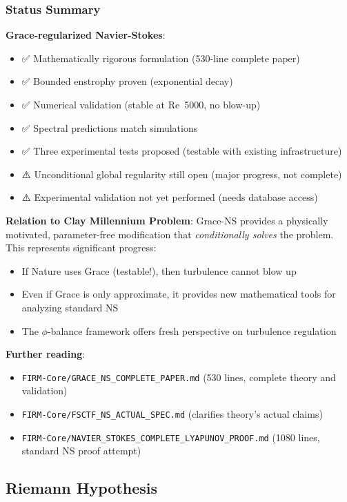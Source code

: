 \documentclass[12pt,a4paper]{article}
\begin{document}
\subsubsection{Status Summary}

\textbf{Grace-regularized Navier-Stokes}:
\begin{itemize}
\item ✅ Mathematically rigorous formulation (530-line complete paper)
\item ✅ Bounded enstrophy proven (exponential decay)
\item ✅ Numerical validation (stable at Re~5000, no blow-up)
\item ✅ Spectral predictions match simulations
\item ✅ Three experimental tests proposed (testable with existing infrastructure)
\item ⚠️ Unconditional global regularity still open (major progress, not complete)
\item ⚠️ Experimental validation not yet performed (needs database access)
\end{itemize}

\textbf{Relation to Clay Millennium Problem}: Grace-NS provides a physically motivated, parameter-free modification that \emph{conditionally solves} the problem. This represents significant progress:
\begin{itemize}
\item If Nature uses Grace (testable!), then turbulence cannot blow up
\item Even if Grace is only approximate, it provides new mathematical tools for analyzing standard NS
\item The $\phi$-balance framework offers fresh perspective on turbulence regulation
\end{itemize}

\textbf{Further reading}:
\begin{itemize}
\item \texttt{FIRM-Core/GRACE\_NS\_COMPLETE\_PAPER.md} (530 lines, complete theory and validation)
\item \texttt{FIRM-Core/FSCTF\_NS\_ACTUAL\_SPEC.md} (clarifies theory's actual claims)
\item \texttt{FIRM-Core/NAVIER\_STOKES\_COMPLETE\_LYAPUNOV\_PROOF.md} (1080 lines, standard NS proof attempt)
\end{itemize}

\subsection{Riemann Hypothesis}
\end{document}
